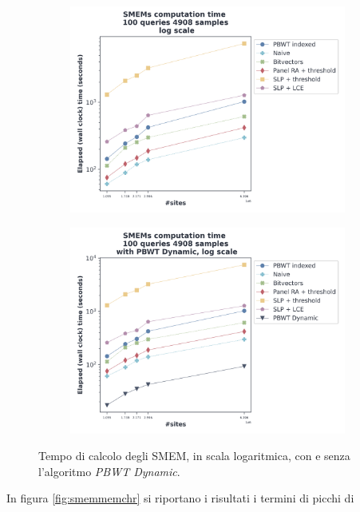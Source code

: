 \begin{figure}
  \centering
  \begin{subfigure}{.5\textwidth}
    \centering
    \includegraphics[width=\linewidth]{img/exe_time_log.png}
  \end{subfigure}%
  \begin{subfigure}{.5\textwidth}
    \centering
    \includegraphics[width=\linewidth]{img/exe_time_dyn_log.png}
  \end{subfigure}
  \caption{Tempo di calcolo degli SMEM, in scala logaritmica, con e senza
    l'algoritmo \textit{PBWT Dynamic}.}
  \label{fig:smemtimechr}
\end{figure}
In figura \ref{fig:smemmemchr} si riportano i risultati i termini di picchi di
